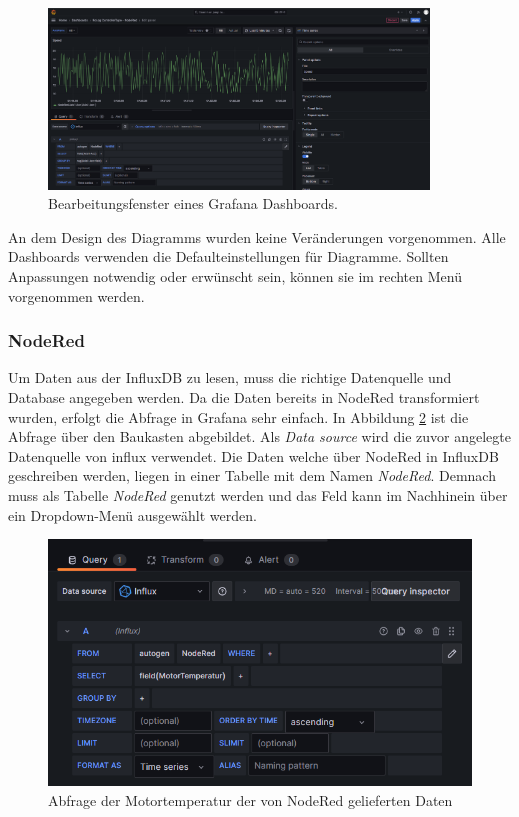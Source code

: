 \documentclass[a4paper, 12pt, oneside, toc=listofnumbered, bibliography=totoc]{scrbook}
\begin{document}
		\begin{figure}[H]
			\centering
			\includegraphics[width=0.9\textwidth]{res/Grafana-Diagramm.png}
			\caption{Bearbeitungsfenster eines Grafana Dashboards.}
			\label{fig:GrafanaDiagramm}
		\end{figure}
	
		An dem Design des Diagramms wurden keine Veränderungen vorgenommen. Alle Dashboards verwenden die Defaulteinstellungen für Diagramme. Sollten Anpassungen notwendig oder erwünscht sein, können sie im rechten Menü vorgenommen werden.
		
			\subsubsection{NodeRed}\label{ch:NodeRedGrafana}
			
			Um Daten aus der InfluxDB zu lesen, muss die richtige Datenquelle und Database angegeben werden. Da die Daten bereits in NodeRed transformiert wurden, erfolgt die Abfrage in Grafana sehr einfach. In Abbildung \ref{fig:noderedabfrage} ist die Abfrage über den Baukasten abgebildet. Als \textit{Data source} wird die zuvor angelegte Datenquelle von influx verwendet. Die Daten welche über NodeRed in InfluxDB geschreiben werden, liegen in einer Tabelle mit dem Namen \textit{NodeRed}.  Demnach muss als Tabelle \textit{NodeRed} genutzt werden und das Feld kann im Nachhinein über ein Dropdown-Menü ausgewählt werden.
		
		\begin{figure}[H]
			\centering
			\includegraphics[width=0.9\linewidth]{res/NodeRedAbfrage.png}
			\caption{Abfrage der Motortemperatur der von NodeRed gelieferten Daten}
			\label{fig:noderedabfrage}
		\end{figure}
		
\end{document}
